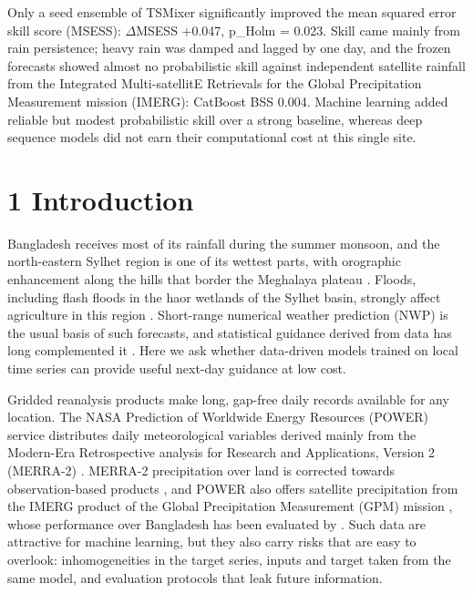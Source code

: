 \documentclass[
]{article}
\begin{document}
Only a seed ensemble of TSMixer significantly improved the mean squared error skill score (MSESS): $\Delta$MSESS +0.047, p\_Holm = 0.023.  %
Skill came mainly from rain persistence; heavy rain was damped and lagged by one day, and the frozen forecasts showed almost no probabilistic skill against independent satellite rainfall from the Integrated Multi-satellitE Retrievals for the Global Precipitation Measurement mission (IMERG): CatBoost BSS 0.004.  %
Machine learning added reliable but modest probabilistic skill over a strong baseline, whereas deep sequence models did not earn their computational cost at this single site.

\hypertarget{introduction}{%
\section{1 Introduction}\label{introduction}}

Bangladesh receives most of its rainfall during the summer monsoon, and the north-eastern Sylhet region is one of its wettest parts, with orographic enhancement along the hills that border the Meghalaya plateau \citep{shahid2010}. Floods, including flash floods in the haor wetlands of the Sylhet basin, strongly affect agriculture in this region \citep{brammer1990}. Short-range numerical weather prediction (NWP) is the usual basis of such forecasts, and statistical guidance derived from data has long complemented it \citep{wilks2019}. Here we ask whether data-driven models trained on local time series can provide useful next-day guidance at low cost.

Gridded reanalysis products make long, gap-free daily records available for any location. The NASA Prediction of Worldwide Energy Resources (POWER) service distributes daily meteorological variables derived mainly from the Modern-Era Retrospective analysis for Research and Applications, Version 2 (MERRA-2) \citep{gelaro2017, sparks2018}. MERRA-2 precipitation over land is corrected towards observation-based products \citep{reichle2017}, and POWER also offers satellite precipitation from the IMERG product of the Global Precipitation Measurement (GPM) mission \citep{huffman2020}, whose performance over Bangladesh has been evaluated by \citet{ahmed2021}. Such data are attractive for machine learning, but they also carry risks that are easy to overlook: inhomogeneities in the target series, inputs and target taken from the same model, and evaluation protocols that leak future information.
\end{document}
